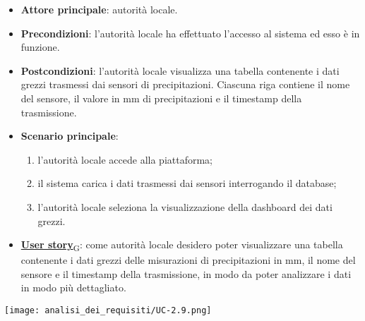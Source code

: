 \begin{itemize}
	\item \textbf{Attore principale}: autorità locale.
	\item \textbf{Precondizioni}: l'autorità locale ha effettuato l'accesso al sistema ed esso è in funzione.
	\item \textbf{Postcondizioni}: l'autorità locale visualizza una tabella contenente i dati grezzi trasmessi dai sensori di precipitazioni.
	      Ciascuna riga contiene il nome del sensore, il valore in mm di precipitazioni e il timestamp della trasmissione.
	\item \textbf{Scenario principale}:
	      \begin{enumerate}
		      \item l'autorità locale accede alla piattaforma;
		      \item il sistema carica i dati trasmessi dai sensori interrogando il database;
		      \item l'autorità locale seleziona la visualizzazione della dashboard dei dati grezzi.
	      \end{enumerate}
	\item \href{https://7last.github.io/docs/rtb/documentazione-interna/glossario\#user-story}{\textbf{User story}\textsubscript{G}}:
	      come autorità locale desidero poter visualizzare una tabella contenente i dati grezzi delle misurazioni di precipitazioni in mm,
	      il nome del sensore e il timestamp della trasmissione, in modo da poter analizzare i dati in modo più dettagliato.
\end{itemize}
\begin{center}
	\texttt{[image: analisi\_dei\_requisiti/UC-2.9.png]}
\end{center}


